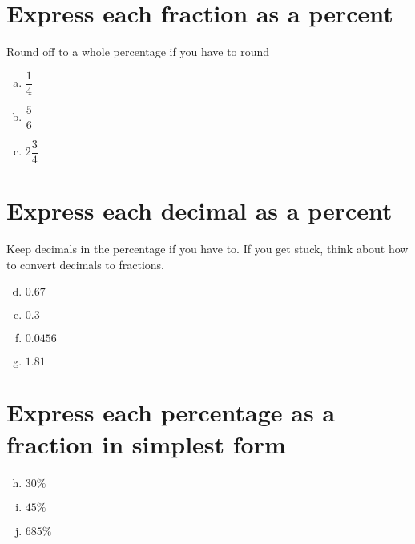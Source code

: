 \documentclass[12pt,letterpaper]{article}
\begin{document}
\begin{large}

\section*{Express each fraction as a percent}
{Round off to a whole percentage if you have to round}

\begin{enumerate}[(a)]

\item $\dfrac{1}{4}$

\addvspace{0.3in}

\item $\dfrac{5}{6}$

\addvspace{0.3in}

\item $2 \dfrac{3}{4}$

\addvspace{0.3in}

\end{enumerate}

\section*{Express each decimal as a percent}
{Keep decimals in the percentage if you have to. If you get stuck, think about how to convert decimals to fractions.}

\begin{enumerate}[(a)]
\setcounter{enumi}{3}

\item $0.67$

\addvspace{0.3in}

\item $0.3$

\addvspace{0.3in}

\item $0.0456$

\addvspace{0.3in}

\item $1.81$

\addvspace{0.3in}

\end{enumerate}

\section*{Express each percentage as a fraction in simplest form}

\begin{enumerate}[(a)]
\setcounter{enumi}{7}

\item $30\%$

\addvspace{0.3in}

\item $45\%$

\addvspace{0.3in}

\item $685\%$

\addvspace{0.3in}

\end{enumerate}

\end{large}
\end{document}
